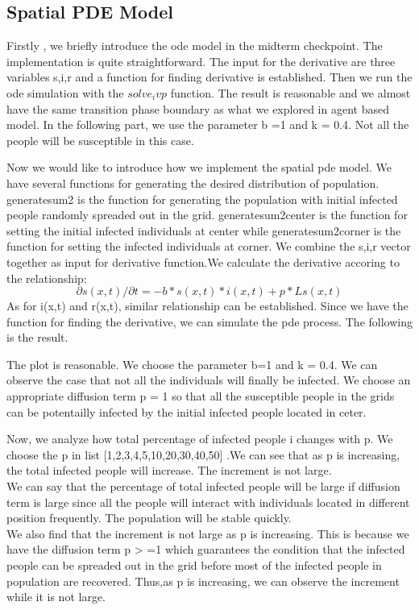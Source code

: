 \documentclass{article}
\begin{document}
\subsection{Spatial PDE Model}
Firstly , we briefly introduce the ode model in the midterm checkpoint. The implementation is quite straightforward. The input for the derivative are three variables s,i,r and a function for finding derivative is established. Then we run the ode simulation with the $solve_ivp$ function. The result is reasonable and we almost have the same transition phase boundary as what we explored in agent based model. In the following part, we use the parameter b =1 and k = 0.4. Not all the people will be susceptible in this case.

Now we would like to introduce how we implement the spatial pde model. We have several functions for generating the desired distribution of population. generatesum2 is the function for generating the population with initial infected people randomly spreaded out in the grid. generatesum2center is the function for setting the initial infected individuals at center while generatesum2corner is the function for setting the infected individuals at corner. We combine the s,i,r vector together as input for derivative function.We calculate the derivative accoring to the relationship:\\
$$\partial s(x,t)/\partial t = - b*s(x,t)*i(x,t) + p *L  s(x,t)$$
As for i(x,t) and r(x,t), similar relationship can be established. Since we have the function for finding the derivative, we can simulate the pde process. The following is the result.

The plot is reasonable. We choose the parameter b=1 and k = 0.4. We can observe the case that not all the individuals will finally be infected. We choose an appropriate diffusion term p = 1 so that all the susceptible people in the grids can be potentailly infected by the initial infected people located in ceter.

Now, we analyze how total percentage of infected people i changes with p. We choose the p in list [1,2,3,4,5,10,20,30,40,50] .We can see that as p is increasing, the total infected people will increase. The increment is not large.\\
 We can say that the percentage of total infected people will be large if diffusion term is large since all the people will interact with individuals located in different position frequently. The population will be stable quickly. \\
 We also find that the increment is not large as p is increasing. This is because we have the diffusion term p > =1 which guarantees the condition that the infected people can be spreaded out in the grid before most of the infected people in population are recovered.
 Thus,as p is increasing, we can observe the increment while it is not large.\\
\end{document}
